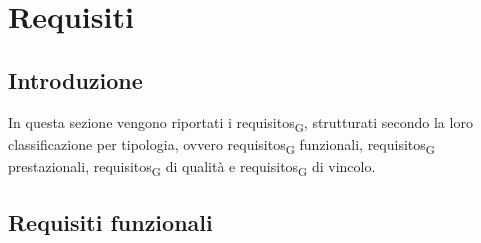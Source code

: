 \section{Requisiti}
\subsection{Introduzione}
In questa sezione vengono riportati i \glspl{requisito}\textsubscript{G}, strutturati secondo la loro classificazione per tipologia, ovvero \glspl{requisito}\textsubscript{G} funzionali, \glspl{requisito}\textsubscript{G} prestazionali, \glspl{requisito}\textsubscript{G} di qualità e \glspl{requisito}\textsubscript{G} di vincolo.
\newline 
\subsection{Requisiti funzionali}
\renewcommand{\arraystretch}{1.5}
